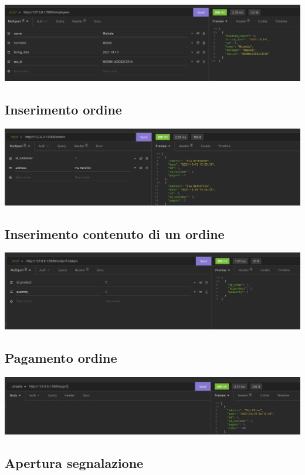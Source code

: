 \includegraphics[scale=0.33]{images/inserimento_dipendente.png}

\subsection{Inserimento ordine}
\includegraphics[scale=0.33]{images/ordine.png}

\subsection{Inserimento contenuto di un ordine}

\includegraphics[scale=0.33]{images/inserimento_contenuto.png}


\subsection{Pagamento ordine}

\includegraphics[scale=0.33]{images/ordine_pagato.png}

\subsection{Apertura segnalazione}

